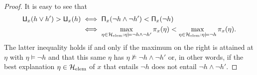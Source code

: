\documentclass[10pt,a4paper]{amsart}
\renewcommand{\H}{\mathcal{H}}
\newcommand{\lPi}{\rotatebox[origin=c]{180}{$\mathsf{\Pi}$}} %
\newcommand{\uPi}{\mathsf{\Pi}}%
\begin{document}
\begin{proof}
It is easy to see that 
\begin{align*}
\lPi_x(h \lor h') > \lPi_x(h) & \iff \uPi_x(\neg h \land \neg h') < \uPi_x(\neg h) \\
& \iff \max_{\eta \in \H_\text{elem}: \eta \models \neg h \land \neg h'} \pi_x(\eta) < \max_{\eta \in \H_\text{elem}: \eta \models \neg h} \pi_x(\eta). 
\end{align*}
The latter inequality holds if and only if the maximum on the right is attained at $\eta$ with $\eta \models \neg h$ and that this same $\eta$ has $\eta \not\models \neg h \land \neg h'$ or, in other words, if the best explanation $\eta \in \H_\text{\rm elem}$ of $x$ that entails $\neg h$ does not entail $\neg h \land \neg h'$.
\end{proof}
\end{document}
